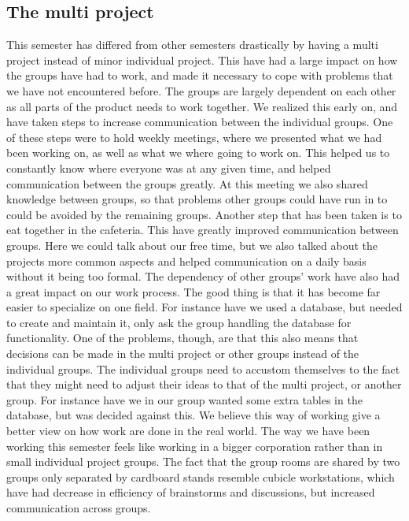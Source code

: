 \subsection*{The multi project}
This semester has differed from other semesters drastically by having a multi project instead of minor individual project. 
This have had a large impact on how the groups have had to work, and made it necessary to cope with problems that we have not encountered before.\newline
The groups are largely dependent on each other as all parts of the product needs to work together. 
We realized this early on, and have taken steps to increase communication between the individual groups. 
One of these steps were to hold weekly meetings, where we presented what we had been working on, as well as what we where going to work on.\newline 
This helped us to constantly know where everyone was at any given time, and helped communication between the groups greatly. 
At this meeting we also shared knowledge between groups, so that problems other groups could have run in to could be avoided by the remaining groups.\newline
Another step that has been taken is to eat together in the cafeteria. This have greatly improved communication between groups. 
Here we could talk about our free time, but we also talked about the projects more common aspects and helped communication on a daily basis without it being too formal.\newline
The dependency of other groups' work have also had a great impact on our work process. 
The good thing is that it has become far easier to specialize on one field. 
For instance have we used a database, but needed to create and maintain it, only ask the group handling the database for functionality. 
One of the problems, though, are that this also means that decisions can be made in the multi project or other groups instead of the individual groups.\newline
The individual groups need to accustom themselves to the fact that they might need to adjust their ideas to that of the multi project, or another group. 
For instance have we in our group wanted some extra tables in the database, but was decided against this.\newline
We believe this way of working give a better view on how work are done in the real world. 
The way we have been working this semester feels like working in a bigger corporation rather than in small individual project groups.  
The fact that the group rooms are shared by two groups only separated by cardboard stands resemble cubicle workstations, which have had decrease in efficiency of brainstorms and discussions, but increased communication across groups.\newline
\\

